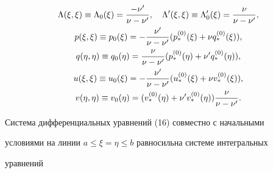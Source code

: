 \begin{gather} 


\Lambda(\xi,\xi)\equiv\Lambda_0(\xi)= 


\frac{-\nu'}{\nu-\nu'},\quad \Lambda'(\xi,\xi)\equiv\Lambda'_0(\xi)= 


\frac{\nu}{\nu-\nu'},\notag \\ 


% 


p(\xi,\xi)\equiv p_0(\xi)=-\frac{\nu'}{\nu-\nu'} 


(p^{(0)}_*(\xi)+\nu q^{(0)}_*(\xi)),\notag \\ 


% 


q(\eta,\eta)\equiv q_0(\eta)=\frac{\nu}{\nu-\nu'} 


(p^{(0)}_*(\eta)+\nu' q^{(0)}_*(\eta)), \\ 


% 


u(\xi,\xi)\equiv u_0(\xi)=-\frac{\nu'}{\nu-\nu'} 


(u^{(0)}_*(\xi)+\nu v^{(0)}_*(\xi)),\notag \\ 


% 


v(\eta,\eta)\equiv v_0(\eta)=(v^{(0)}_*(\eta)+ 


\nu' v^{(0)}_*(\eta))\frac{\nu}{\nu-\nu'}.\notag 


\end{gather} 


 


Система дифференциальных уравнений (16) совместно с начальными 


условиями на линии $a\le\xi=\eta\le b$ равносильна системе интегральных 


уравнений 


